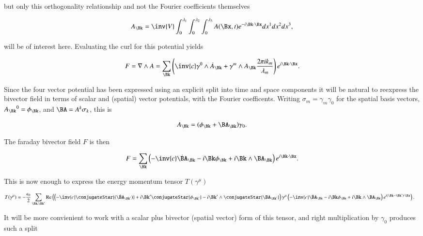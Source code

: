 but only this orthogonality relationship and not the Fourier coefficients themselves

\begin{align}
\label{eqn:fourierMaxVac:7}
A_\Bk = 
\inv{ V }
\int_0^{\lambda_1}
\int_0^{\lambda_2}
\int_0^{\lambda_3} A(\Bx, t) e^{- i \Bk \cdot \Bx} dx^1 dx^2 dx^3,
\end{align}

will be of interest here.  Evaluating the curl for this potential yields

\begin{align}\label{eqn:fourierMaxVac:8}
F = \grad \wedge A
= \sum_{\Bk} \left( \inv{c} \gamma^0 \wedge \dot{A}_\Bk + \gamma^m \wedge A_\Bk \frac{2 \pi i k_m}{\lambda_m} \right) e^{i \Bk \cdot \Bx}.
\end{align}

Since the four vector potential has been expressed using an explicit split into time and space components it will be natural to reexpress the bivector field in terms of scalar and (spatial) vector potentials, with the Fourier coefficents.  Writing $\sigma_m = \gamma_m \gamma_0$ for the spatial basis vectors, ${A_\Bk}^0 = \phi_\Bk$, and $\BA = A^k \sigma_k$, this is

\begin{align}\label{eqn:fourierMaxVac:71}
A_\Bk = (\phi_\Bk + \BA_\Bk) \gamma_0.
\end{align}

The faraday bivector field $F$ is then

\begin{align}\label{eqn:fourierMaxVac:72}
F = \sum_\Bk \left( -\inv{c} \dot{\BA}_\Bk - i \Bk \phi_\Bk + i \Bk \wedge \BA_\Bk \right) e^{i \Bk \cdot \Bx}.
\end{align}

This is now enough to express the energy momentum tensor $T(\gamma^\mu)$

\begin{align}\label{eqn:fourierMaxVac:73}
T(\gamma^\mu) 
&= -\frac{\epsilon_0}{2} \sum_{\Bk,\Bk'}
\Real \left(
\left( -\inv{c} \conjugateStar{(\dot{\BA}_{\Bk'})} + i \Bk' \conjugateStar{\phi_{\Bk'}} - i \Bk' \wedge \conjugateStar{\BA_{\Bk'}} \right) 
\gamma^\mu 
\left( -\inv{c} \dot{\BA}_\Bk - i \Bk \phi_\Bk + i \Bk \wedge \BA_\Bk \right) e^{i (\Bk -\Bk') \cdot \Bx}
\right).
\end{align}

It will be more convienient to work with a scalar plus bivector (spatial vector) form of this tensor, and right multiplication by $\gamma_0$ produces such a split

